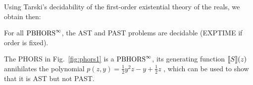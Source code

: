 \documentclass{easychair}
\begin{document}

Using Tarski's decidability of the first-order existential theory of the reals, we obtain then:
\begin{theorem}
	For all $\text{PBHORS}^{\infty}$, the AST and PAST problems are decidable (EXPTIME if order is fixed).
%	
\end{theorem}
\begin{example}
The PHORS in Fig.~\ref{fig:phors1} is a $\text{PBHORS}^{\infty}$, its generating function $\llbracket S\rrbracket(z)$ 
annihilates the polynomial $p(z,y)=\frac{1}{2}y^2z-y+\frac{1}{2}z$ 
, which can be used to show that it is AST but not PAST.
\end{example}
\end{document}
